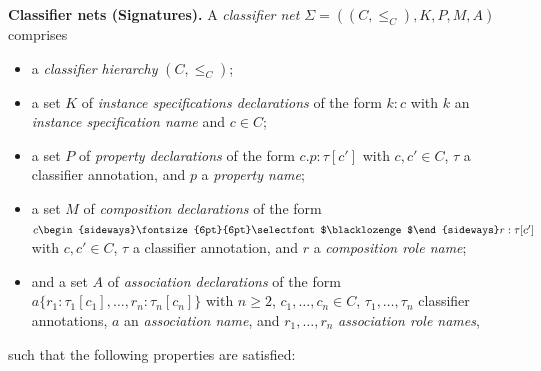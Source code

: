 \documentclass[10pt,fleqn,%
\ifpretendfinal
final%
\else
draft%
\fi,
]{scrreprt}
\newcommand{\composition}{\raisebox{0.2pt}{\begin{sideways}\fontsize{6pt}{6pt}\selectfont$\blacklozenge$\end{sideways}}}
\begin{document}
\medskip\noindent\textbf{Classifier nets (Signatures).}
A \emph{classifier net} $\Sigma = ((C, {\leq_C}), K, P, M, A)$
comprises
%
\begin{itemize}[label={--}, leftmargin=*]
  \item a \emph{classifier hierarchy} $(C, {\leq_C})$;

  \item a set $K$ of \emph{instance specifications declarations} of
the form $k : c$ with $k$ an \emph{instance specification name} and $c
\in C$;

  \item a set $P$ of \emph{property declarations} of the form
$c.p : \tau[c']$ with $c, c' \in C$, $\tau$ a classifier annotation, and
$p$ a \emph{property name};

  \item a set $M$ of \emph{composition declarations} of the form
$c\composition r : \tau[c']$ with $c, c' \in C$, $\tau$ a classifier
annotation, and $r$ a \emph{composition role name};

  \item and a set $A$ of \emph{association declarations} of the form
$a\{ r_1 : \tau_1[c_1], \dots, r_n : \tau_n[c_n] \}$ with $n \geq 2$,
$c_1, \dots, c_n \in C$, $\tau_1, \ldots, \tau_n$ classifier
annotations, $a$ an \emph{association name}, and $r_1, \dots, r_n$
\emph{association role names},
\end{itemize}
%
such that the following properties are satisfied:
%
\end{document}
